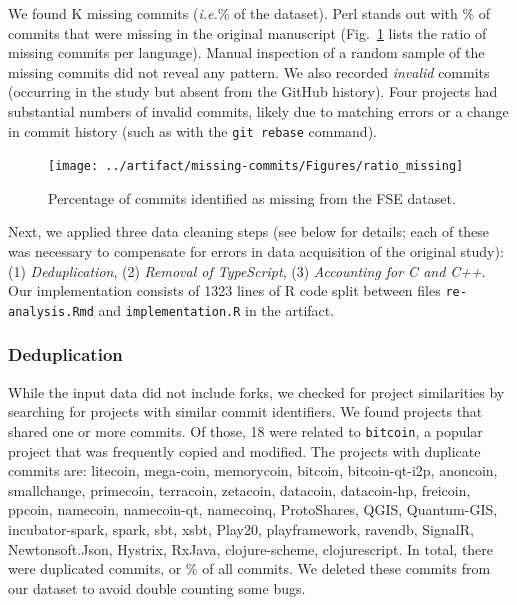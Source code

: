 \documentclass[acmsmall]{acmart}
\newcommand{\pct}[1]{#1\!\!\%\xspace}
\newcommand{\gh}{{GitHub}\xspace}
\newcommand{\code}[1]{{\tt\small #1}\xspace}
\newcommand{\ie}{\emph{i.e.}\xspace}
\begin{document}
We found \MissingCommitsThousands\!K missing commits
(\ie \pct{\MissingCommitsRatio} of the dataset). Perl stands out with
\pct{\PerlMissingRatio} of commits that were missing in the original
manuscript (Fig.~\ref{miss} lists the ratio of missing commits per
language). Manual inspection of a random sample of the missing commits did
not reveal any pattern.  
We also recorded {\it invalid} commits (occurring in the study but absent
from the \gh history). Four projects had substantial numbers of invalid
commits, likely due to matching errors or a change in commit history (such
as with the \code{git rebase} command).

\begin{figure}[!h]
\texttt{[image: ../artifact/missing-commits/Figures/ratio\_missing]}
\vspace{-8mm}
\caption{Percentage of commits identified as missing from the FSE dataset.}\label{miss}%
\end{figure}

Next, we applied three data cleaning steps (see below for details; each of
these was necessary to compensate for errors in data acquisition of the
original study): (1) \emph{Deduplication}, (2) \emph{Removal of TypeScript},
(3) \emph{Accounting for C and C++}.  Our implementation consists of 1323
lines of R code split between files \code{\small re-analysis.Rmd} and
\code{\small implem\-entation.R} in the artifact.


\subsubsection{Deduplication}
While the input data did not include forks, we checked for project
similarities by searching for projects with similar commit identifiers.  We
found \numberOfProjectsWithDuplicates projects that shared one or more
commits. Of those, 18 were related to \code{bitcoin}, a popular project that
was frequently copied and modified. The projects with duplicate commits are:
%
{\newcommand{\xxx}[1]{{\sf\small #1}}
\xxx{litecoin},
\xxx{mega}-\xxx{coin},
\xxx{memorycoin},
\xxx{bitcoin},
\xxx{bitcoin-qt-i2p},
\xxx{anoncoin},
\xxx{smallchange},
\xxx{primecoin},
\xxx{terracoin},
\xxx{zetacoin},
\xxx{datacoin},
\xxx{datacoin-hp},
\xxx{freicoin},
\xxx{ppcoin},
\xxx{namecoin},
\xxx{namecoin-qt},
\xxx{namecoinq},
\xxx{ProtoShares},
\xxx{QGIS},
\xxx{Quantum-GIS},
\xxx{incub\-ator-spark},
\xxx{spark},          
\xxx{sbt},
\xxx{xsbt},
\xxx{Play20},
\xxx{playframework},
\xxx{ravendb},
\xxx{SignalR},
\xxx{Newtonsoft.Json},
\xxx{Hystrix},
\xxx{RxJava},
\xxx{clojure-scheme},
\xxx{clojurescript}}.
%
In total, there were \numDuplicateCommits duplicated commits, or
\pct{\percentageDuplicateCommits} of all commits. We deleted these commits
from our dataset to avoid double counting some bugs.
\end{document}
